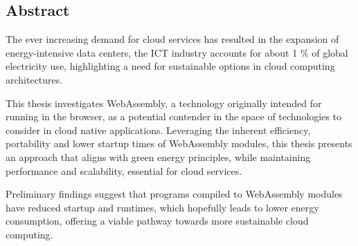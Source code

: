 \documentclass[
  table]{report}
\begin{document}
\vspace*{\fill}
\begin{center}
\begin{minipage}{0.75\textwidth}

\chapter*{Abstract}

The ever increasing demand for cloud services has resulted in the expansion of
energy-intensive data centers, the ICT industry accounts for about 1 \% of global 
electricity use, highlighting a need for sustainable options
in cloud computing architectures.

\vspace{0.25cm}

This thesis investigates WebAssembly, a technology originally intended for running 
in the browser, as a potential contender in the space of technologies to
consider in cloud native applications. Leveraging the inherent efficiency,
portability and lower startup times of WebAssembly modules, this thesis presents an
approach that aligns with green energy principles, while maintaining performance and
scalability, essential for cloud services. 

\vspace{0.25cm}

Preliminary findings suggest that programs compiled to WebAssembly modules have
reduced startup and runtimes, which hopefully leads to lower energy consumption,
offering a viable pathway towards more sustainable cloud computing.

\end{minipage}
\end{center}
\vspace*{\fill}

\newpage
\end{document}
